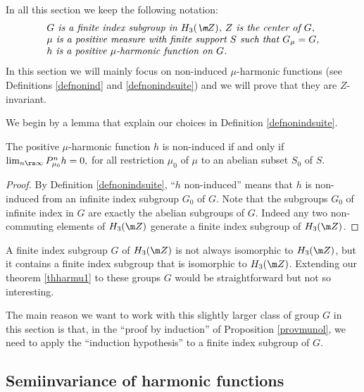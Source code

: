 In all this section we keep the following notation:
\begin{equation}
\label{eqnnotsta}
\begin{array}{l}
\textit{$G$ is a finite index subgroup in $H_3(\m Z)$,
$Z$ is the center of $G$,}\\
\textit{$\mu$ is a positive measure with finite support $S$
such that $G_\mu=G$,}\\
\textit{$h$ is a positive $\mu$-harmonic function on $G$.}
\end{array}
\end{equation}
In this section we will mainly focus on non-induced $\mu$-harmonic functions
(see Definitions \ref{defnonind} and \ref{defnonindsuite})
and we will prove that they are $Z$-invariant.

We begin by a lemma that explain our choices in Definition \ref{defnonindsuite}.

\begin{Lem}
\label{lemnonind}
The positive $\mu$-harmonic function $h$ is non-induced if and only if
$\lim_{n\ra\infty}P_{\mu_0}^nh=0,$
for all restriction $\mu_0$ of $\mu$ to an abelian subset $S_0$ of $S$.
\end{Lem}

\begin{proof} By Definition \ref{defnonindsuite}, ``$h$ non-induced'' means that $h$
is non-induced from an infinite index subgroup $G_0$ of $G$.
Note that the subgroups $G_0$ of infinite index in $G$ are exactly
the abelian subgroups of $G$. Indeed any two non-commuting elements of $H_3(\m Z)$
generate a finite index subgroup of $H_3(\m Z)$.
\end{proof}

\begin{Rem}

A finite index subgroup $G$ of $H_3(\m Z)$
is not always isomorphic to $H_3(\m Z)$,
but it contains a finite index subgroup
that is isomorphic to $H_3(\m Z)$.
Extending our theorem \ref{thharmu1} to these groups $G$
would be straightforward but not so interesting.

The main reason we want to work with this slightly larger class of group $G$
in this section
is that, in the ``proof by induction'' of Proposition \ref{provmunol},
we need to apply
the ``induction hypothesis'' to a finite index subgroup of $G$.
\end{Rem}

\subsection{Semiinvariance of harmonic functions}
\label{secseminv}


